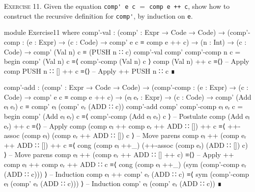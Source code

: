 \documentclass{article}
\begin{document}
\noindent
\textsc{Exercise 11.} Given the equation \verb!comp' e c! $=$ \verb!comp e ++ c!, show how to construct the recursive definition for \verb!comp'!, by induction on \texttt{e}.

\begin{code}
module Exercise11 where
  comp'-val : (comp' : Expr → Code → Code)
    → (comp'-comp : (e : Expr) → (c : Code) → comp' e c ≡ comp e ++ c)
    → (n : Int) → (c : Code) → comp' (Val n) c ≡ (PUSH n ∷ c)
  comp'-val comp' comp'-comp n c =
    begin
      comp' (Val n) c
    ≡⟨ comp'-comp (Val n) c ⟩
      comp (Val n) ++ c
    ≡⟨⟩ -- Apply comp
      PUSH n ∷ [] ++ c
    ≡⟨⟩ -- Apply ++
      PUSH n ∷ c
    ∎
\end{code}
\begin{code}
  comp'-add : (comp' : Expr → Code → Code)
    → (comp'-comp : (e : Expr) → (c : Code) → comp' e c ≡ comp e ++ c)
    → (eₗ eᵣ : Expr) → (c : Code)
    → comp' (Add eₗ eᵣ) c ≡ comp' eₗ (comp' eᵣ (ADD ∷ c))
  comp'-add comp' comp'-comp eₗ eᵣ c =
    begin
      comp' (Add eₗ eᵣ) c
    ≡⟨ comp'-comp (Add eₗ eᵣ) c ⟩ -- Postulate
      comp (Add eₗ eᵣ) ++ c
    ≡⟨⟩ -- Apply comp
      (comp eₗ ++ comp eᵣ ++ ADD ∷ []) ++ c
    ≡⟨ ++-assoc (comp eₗ) (comp eᵣ ++ ADD ∷ []) c ⟩ -- Move parens
      comp eₗ ++ (comp eᵣ ++ ADD ∷ []) ++ c
    ≡⟨ cong (comp eₗ ++_) (++-assoc (comp eᵣ) (ADD ∷ []) c) ⟩ -- Move parens
      comp eₗ ++ (comp eᵣ ++ ADD ∷ [] ++ c)
    ≡⟨⟩ -- Apply ++
      comp eₗ ++ comp eᵣ ++ ADD ∷ c
    ≡⟨ cong (comp eₗ ++_) (sym (comp'-comp eᵣ (ADD ∷ c))) ⟩ -- Induction
      comp eₗ ++ comp' eᵣ (ADD ∷ c)
    ≡⟨ sym (comp'-comp eₗ (comp' eᵣ (ADD ∷ c))) ⟩ -- Induction
      comp' eₗ (comp' eᵣ (ADD ∷ c))
    ∎
\end{code}
\end{document}
